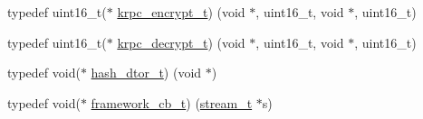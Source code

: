 \begin{DoxyCompactItemize}
\item 
typedef uint16\+\_\+t($\ast$ \hyperlink{a00047_ae41a67cc07f8dff897ca978e03b1f2d7_ae41a67cc07f8dff897ca978e03b1f2d7}{krpc\+\_\+encrypt\+\_\+t}) (void $\ast$, uint16\+\_\+t, void $\ast$, uint16\+\_\+t)
\item 
typedef uint16\+\_\+t($\ast$ \hyperlink{a00047_a5cf750f151c90f0589f68fe8c4421f1d_a5cf750f151c90f0589f68fe8c4421f1d}{krpc\+\_\+decrypt\+\_\+t}) (void $\ast$, uint16\+\_\+t, void $\ast$, uint16\+\_\+t)
\item 
typedef void($\ast$ \hyperlink{a00047_a5dcd1ed9242185e4448352748e58573d_a5dcd1ed9242185e4448352748e58573d}{hash\+\_\+dtor\+\_\+t}) (void $\ast$)
\item 
typedef void($\ast$ \hyperlink{a00047_a4252553890b97d1b0869581b40e11c3e_a4252553890b97d1b0869581b40e11c3e}{framework\+\_\+cb\+\_\+t}) (\hyperlink{a00047_a261dba04f46f5c59a68a05f69f5a65a8_a261dba04f46f5c59a68a05f69f5a65a8}{stream\+\_\+t} $\ast$s)
\end{DoxyCompactItemize}
